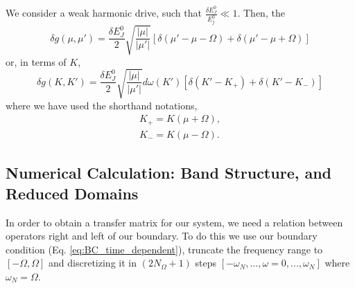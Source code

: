 %
We consider a weak harmonic drive, such that $\frac{\delta E^0_J}{E^0_j} \ll 1$. Then, the
%
\begin{equation}
    \delta g(\mu, \mu') =
    \frac{\delta E_J^0}{2}
    \sqrt{\frac{|\mu|}{|\mu'|}}
    \left[
    \delta (\mu' - \mu - \Omega) +
    \delta(\mu' - \mu + \Omega)
    \right]
\end{equation}
%
or, in terms of $K$,
\begin{equation} \label{eq:dw_K_continuous}
    \delta g(K,K')= 
    \frac{\delta E_J^0}{2}
    \sqrt{\frac{|\mu|}{|\mu'|}}
    d\omega (K')
    \left[
    \delta (K' - K_+) + \delta(K' - K_-)
    \right]
\end{equation}
% 
where we have used the shorthand notations,
%
\begin{gather}
    K_+ = K(\mu + \Omega),\\
    K_- = K(\mu - \Omega).
\end{gather}
%

\subsection{Numerical Calculation: Band Structure, and Reduced Domains}

In order to obtain a transfer matrix for our system, we need a relation between operators right and left of our boundary. To do this we use our boundary condition (Eq. \ref{eq:BC_time_dependent}), truncate the frequency range to $[-\Omega, \Omega]$ and discretizing it in $(2 N_{\Omega} + 1)$ steps $[-\omega_N, ..., \omega = 0, ..., \omega_N]$ where $\omega_N = \Omega$. 

